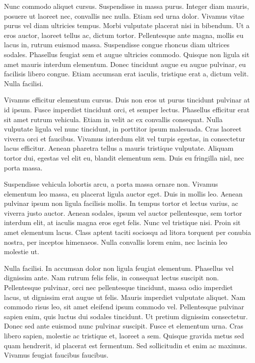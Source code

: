 Nunc commodo aliquet cursus. Suspendisse in massa purus. Integer diam mauris, posuere ut laoreet nec, convallis nec nulla. Etiam sed urna dolor. Vivamus vitae purus vel diam ultricies tempus. Morbi vulputate placerat nisi in bibendum. Ut a eros auctor, laoreet tellus ac, dictum tortor. Pellentesque ante magna, mollis eu lacus in, rutrum euismod massa. Suspendisse congue rhoncus diam ultrices sodales. Phasellus feugiat sem et augue ultricies commodo. Quisque non ligula sit amet mauris interdum elementum. Donec tincidunt augue eu augue pulvinar, eu facilisis libero congue. Etiam accumsan erat iaculis, tristique erat a, dictum velit. Nulla facilisi.

Vivamus efficitur elementum cursus. Duis non eros ut purus tincidunt pulvinar at id ipsum. Fusce imperdiet tincidunt orci, et semper lectus. Phasellus efficitur erat sit amet rutrum vehicula. Etiam in velit ac ex convallis consequat. Nulla vulputate ligula vel nunc tincidunt, in porttitor ipsum malesuada. Cras laoreet viverra orci et faucibus. Vivamus interdum elit vel turpis egestas, in consectetur lacus efficitur. Aenean pharetra tellus a mauris tristique vulputate. Aliquam tortor dui, egestas vel elit eu, blandit elementum sem. Duis eu fringilla nisl, nec porta massa.

Suspendisse vehicula lobortis arcu, a porta massa ornare non. Vivamus elementum leo massa, eu placerat ligula auctor eget. Duis in mollis leo. Aenean pulvinar ipsum non ligula facilisis mollis. In tempus tortor et lectus varius, ac viverra justo auctor. Aenean sodales, ipsum vel auctor pellentesque, sem tortor interdum elit, at iaculis magna eros eget felis. Nunc vel tristique nisi. Proin sit amet elementum lacus. Class aptent taciti sociosqu ad litora torquent per conubia nostra, per inceptos himenaeos. Nulla convallis lorem enim, nec lacinia leo molestie ut.

Nulla facilisi. In accumsan dolor non ligula feugiat elementum. Phasellus vel dignissim ante. Nam rutrum felis felis, in consequat lectus suscipit non. Pellentesque pulvinar, orci nec pellentesque tincidunt, massa odio imperdiet lacus, ut dignissim erat augue ut felis. Mauris imperdiet vulputate aliquet. Nam commodo risus leo, sit amet eleifend ipsum commodo vel. Pellentesque pulvinar sapien enim, quis luctus dui sodales tincidunt. Ut pretium dignissim consectetur. Donec sed ante euismod nunc pulvinar suscipit. Fusce et elementum urna. Cras libero sapien, molestie ac tristique et, laoreet a sem. Quisque gravida metus sed quam hendrerit, id placerat est fermentum. Sed sollicitudin et enim ac maximus. Vivamus feugiat faucibus faucibus.

